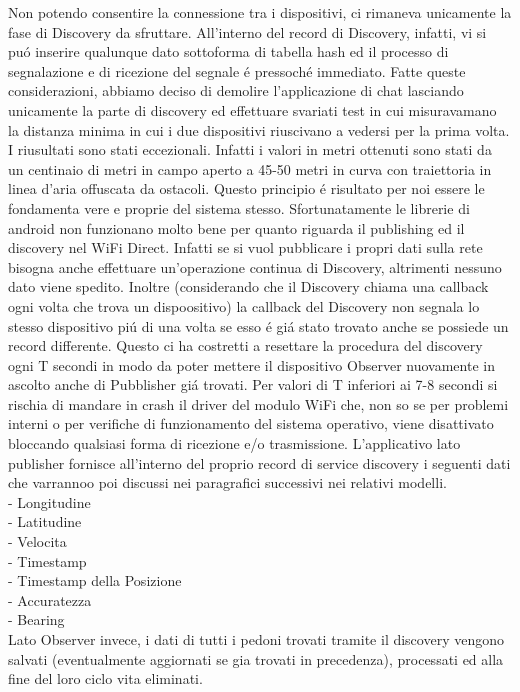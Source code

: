 \documentclass[conference]{IEEEtran}
\begin{document}
Non potendo consentire la connessione tra i dispositivi, ci rimaneva unicamente la fase di Discovery da sfruttare.
All'interno del record di Discovery, infatti, vi si pu\'o inserire qualunque dato sottoforma di tabella hash ed il processo di segnalazione e di ricezione del segnale \'e pressoch\'e immediato.
Fatte queste considerazioni, abbiamo deciso di demolire l'applicazione di chat lasciando unicamente la parte di discovery ed effettuare svariati test in cui misuravamano la distanza minima in cui i due dispositivi riuscivano a vedersi per la prima volta.
I riusultati sono stati eccezionali. Infatti i valori in metri ottenuti sono stati da un centinaio di metri in campo aperto a 45-50 metri in curva con traiettoria in linea d'aria offuscata da ostacoli.
Questo principio \'e risultato per noi essere le fondamenta vere e proprie del sistema stesso.
Sfortunatamente le librerie di android non funzionano molto bene per quanto riguarda il publishing ed il discovery nel WiFi Direct. Infatti se si vuol pubblicare i propri dati sulla rete bisogna anche effettuare un'operazione continua di Discovery, altrimenti nessuno dato viene spedito. Inoltre (considerando che il Discovery chiama una callback ogni volta che trova un dispoositivo) la callback del Discovery non segnala lo stesso dispositivo pi\'u di una volta se esso \'e gi\'a stato trovato anche se possiede un record differente.
Questo ci ha costretti a resettare la procedura del discovery ogni T secondi in modo da poter mettere il dispositivo Observer nuovamente in ascolto anche di Pubblisher gi\'a trovati.
Per valori di T inferiori ai 7-8 secondi si rischia di mandare in crash il driver del modulo WiFi che, non so se per problemi interni o per verifiche di funzionamento del sistema operativo, viene disattivato bloccando qualsiasi forma di ricezione e/o trasmissione.
L'applicativo lato publisher fornisce all'interno del proprio record di service discovery i seguenti dati che varrannoo poi discussi nei paragrafici successivi nei relativi modelli.\\
- Longitudine\\
- Latitudine\\
- Velocita\\
- Timestamp\\
- Timestamp della Posizione\\
- Accuratezza\\
- Bearing\\
Lato Observer invece, i dati di tutti i pedoni trovati tramite il discovery vengono salvati (eventualmente aggiornati se gia trovati in precedenza), processati ed alla fine del loro ciclo vita eliminati.
\end{document}
